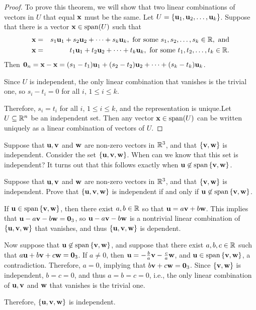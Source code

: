 \begin{proof}
To prove this theorem, we will show that two linear combinations of vectors in $U$ that equal $\mbox{\bf x}$ must be the same. Let $U =\left\{\mbox{\bf u}_1, \mbox{\bf u}_2, \ldots, \mbox{\bf u}_k\right\}$.
Suppose that there is a vector $\vect{x}\in \sspan(U)$ such that
\begin{eqnarray*}
\mbox{\bf x} & = & s_1\mbox{\bf u}_1 + s_2\mbox{\bf u}_2 + \cdots + s_k\mbox{\bf u}_k,
\mbox{ for some } s_1, s_2, \ldots, s_k\in\mathbb{R}, \mbox{ and} \\
\mbox{\bf x} & = & t_1\mbox{\bf u}_1 + t_2\mbox{\bf u}_2 + \cdots + t_k\mbox{\bf u}_k,
\mbox{ for some } t_1, t_2, \ldots, t_k\in\mathbb{R}.
\end{eqnarray*}
Then 
$\mbox{\bf 0}_n=\mbox{\bf x}-\mbox{\bf x} = (s_1-t_1)\mbox{\bf u}_1 + (s_2-t_2)\mbox{\bf u}_2 + \cdots +
(s_k-t_k)\mbox{\bf u}_k$.

Since $U$ is independent, the only linear combination that vanishes
is the trivial one, so $s_i-t_i=0$ for all $i$, $1\leq i\leq k$.

Therefore, $s_i=t_i$ for all $i$, $1\leq i\leq k$, and the
representation is unique.Let $U \subseteq\mathbb{R}^n$ be an independent set.
Then any vector $\vect{x}\in\sspan(U)$ can be written uniquely as a linear combination of vectors of $U$.
\end{proof}

Suppose that $\mbox{\bf u},\mbox{\bf v}$ and $\mbox{\bf w}$ are non-zero vectors in $\mathbb{R}^3$,
and that $\left\{\mbox{\bf v},\mbox{\bf w}\right\}$ is independent. Consider the set $\left\{\mbox{\bf u},\mbox{\bf v},\mbox{\bf w}\right\}$. When can we know that this set is independent? It turns out that this follows exactly when $\vect{u}\not\in\sspan\set{\vect{v},\vect{w}}$.

\begin{example}{}{}
Suppose that $\mbox{\bf u},\mbox{\bf v}$ and $\mbox{\bf w}$ are non-zero vectors in $\mathbb{R}^3$,
and that $\left\{\mbox{\bf v},\mbox{\bf w}\right\}$ is independent.
Prove that $\left\{\mbox{\bf u},\mbox{\bf v},\mbox{\bf w}\right\}$ is independent if and only if 
$\vect{u}\not\in\sspan\set{\vect{v},\vect{w}}$.
\end{example}

\begin{solution}
If $\vect{u}\in\sspan\set{\vect{v},\vect{w}}$, then there exist $a,b\in\mathbb{R}$ so
that $\mbox{\bf u}=a\mbox{\bf v} + b\mbox{\bf w}$.
This implies that $\mbox{\bf u}-a\mbox{\bf v} - b\mbox{\bf w}=\mbox{\bf 0}_3$,
so  $\mbox{\bf u}-a\mbox{\bf v} - b\mbox{\bf w}$
is a nontrivial linear combination of $\left\{\mbox{\bf u},\mbox{\bf v},\mbox{\bf w}\right\}$ that
vanishes, 
and thus $\left\{\mbox{\bf u},\mbox{\bf v},\mbox{\bf w}\right\}$ is dependent.

Now suppose that $\vect{u}\not\in\sspan\set{\vect{v},\vect{w}}$, and suppose
that there exist $a,b,c\in\mathbb{R}$ such that
$a\mbox{\bf u}+b\mbox{\bf v}+c\mbox{\bf w}=\mbox{\bf 0}_3$.
If $a\neq 0$, then $\mbox{\bf u}=-\frac{b}{a}\mbox{\bf v}-\frac{c}{a}\mbox{\bf w}$,
and $\vect{u}\in\sspan\set{\vect{v},\vect{w}}$, a contradiction.
Therefore, $a=0$, implying that $b\mbox{\bf v}+c\mbox{\bf w}=\mbox{\bf 0}_3$.
Since $\left\{\mbox{\bf v},\mbox{\bf w}\right\}$ is independent, $b=c=0$, and thus
$a=b=c=0$, i.e., the only linear combination of 
$\mbox{\bf u},\mbox{\bf v}$ and $\mbox{\bf w}$ that vanishes is the trivial one.

Therefore, $\left\{\mbox{\bf u},\mbox{\bf v},\mbox{\bf w}\right\}$ is independent.
\end{solution}

